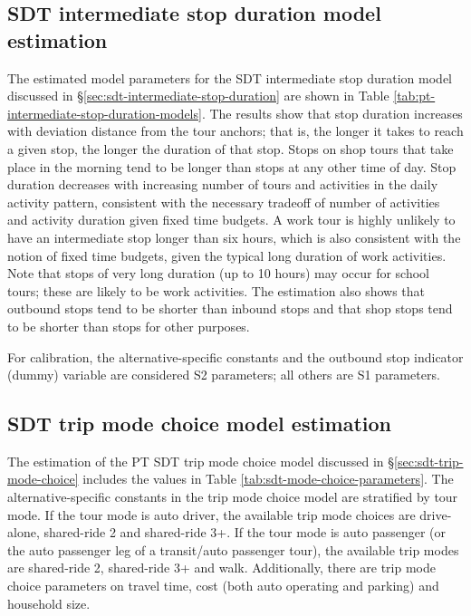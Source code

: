 
 
\subsection{SDT intermediate stop duration model estimation}
The estimated model parameters for the SDT intermediate stop duration model discussed in \S\ref{sec:sdt-intermediate-stop-duration} are shown in Table \ref{tab:pt-intermediate-stop-duration-models}. The results show that stop duration increases with deviation distance from the tour anchors; that is, the longer it takes to reach a given stop, the longer the duration of that stop. Stops on shop tours that take place in the morning tend to be longer than stops at any other time of day. Stop duration decreases with increasing number of tours and activities in the daily activity pattern, consistent with the necessary tradeoff of number of activities and activity duration given fixed time budgets. A work tour is highly unlikely to have an intermediate stop longer than six hours, which is also consistent with the notion of fixed time budgets, given the typical long duration of work activities. Note that stops of very long duration (up to 10 hours) may occur for school tours; these are likely to be work activities. The estimation also shows that outbound stops tend to be shorter than inbound stops and that shop stops tend to be shorter than stops for other purposes.


For calibration, the alternative-specific constants and the outbound stop indicator (dummy) variable are considered S2 parameters; all others are S1 parameters.
 
\subsection{SDT trip mode choice model estimation}
The estimation of the PT SDT trip mode choice model discussed in \S\ref{sec:sdt-trip-mode-choice} includes the values in Table \ref{tab:sdt-mode-choice-parameters}. The alternative-specific constants in the trip mode choice model are stratified by tour mode. If the tour mode is auto driver, the available trip mode choices are drive-alone, shared-ride 2 and shared-ride 3+. If the tour mode is auto passenger (or the auto passenger leg of a transit/auto passenger tour), the available trip modes are shared-ride 2, shared-ride 3+ and walk. Additionally, there are trip mode choice parameters on travel time, cost (both auto operating and parking) and household size.

